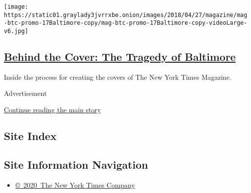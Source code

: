 \begin{enumerate}
  \texttt{[image: https://static01.graylady3jvrrxbe.onion/images/2018/04/27/magazine/mag-btc-promo-17Baltimore-copy/mag-btc-promo-17Baltimore-copy-videoLarge-v6.jpg]}

  \hypertarget{behind-the-cover-the-tragedy-of-baltimore}{%
  \subsection{\texorpdfstring{\href{/2019/03/13/magazine/behind-the-cover-the-tragedy-of-baltimore.html}{Behind
  the Cover: The Tragedy of
  Baltimore}}{Behind the Cover: The Tragedy of Baltimore}}\label{behind-the-cover-the-tragedy-of-baltimore}}

  Inside the process for creating the covers of The New York Times
  Magazine.
\end{enumerate}

Advertisement

\protect\hyperlink{after-mid1}{Continue reading the main story}

\hypertarget{site-index}{%
\subsection{Site Index}\label{site-index}}

\hypertarget{site-information-navigation}{%
\subsection{Site Information
Navigation}\label{site-information-navigation}}

\begin{itemize}
\tightlist
\item
  \href{https://help.nytimes3xbfgragh.onion/hc/en-us/articles/115014792127-Copyright-notice}{©~2020~The
  New York Times Company}
\end{itemize}

